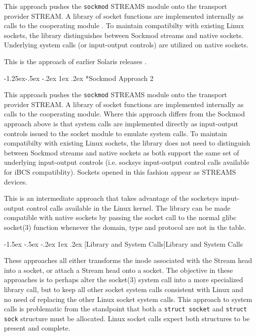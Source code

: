 \documentclass[letterpaper,final,notitlepage,twocolumn,10pt,twoside]{article}
\makeatletter
\renewcommand\subsection{\@startsection{subsection}{2}{\z@}%
                                     {-1.5ex \@plus -.5ex \@minus -.2ex}%
                                     {1ex \@plus .2ex}%
                                     {\normalfont\normalsize\bfseries}}
\renewcommand\subsubsection{\@startsection{subsubsection}{3}{\z@}%
                                     {-1.25ex\@plus -.5ex \@minus -.2ex}%
                                     {1ex \@plus .2ex}%
                                     {\normalfont\normalsize\bfseries}}
\makeatother
\begin{document}
This approach pushes the \texttt{sockmod} STREAMS module onto the transport
provider STREAM.  A library of socket functions are implemented internally as
calls to the cooperating module \cite[]{impbsd}.
To maintain compatibilty with existing Linux sockets, the library
distinguishes between Sockmod streams and native sockets.  Underlying system calls
(or input-output controls) are utilized on native sockets.

This is the approach of earlier Solaris releases \cite[]{impbsd}.

\subsubsection*{Sockmod Approach 2}

This approach pushes the \texttt{sockmod} STREAMS module onto the transport
provider STREAM.  A library of socket functions are implemented internally as
calls to the cooperating module.  Where this approach differs from the Sockmod
approach above is that system calls are implemented directly as input-output
controls issued to the socket module to emulate system calls.
To maintain compatibilty with existing Linux sockets, the library
does not need to distinguish between Sockmod streams and native sockets as
both support the same set of underlying input-output controls (i.e. socksys
input-output control calls available for iBCS compatiblity).  Sockets opened
in this fashion appear as STREAMS devices.

This is an intermediate approach that takes advantage of the socketsys
input-output control calls available in the Linux kernel.
The library can be made compatible with native sockets by passing the socket
call to the normal glibc socket(3) function whenever the domain, type and
protocol are not in the table.

\subsection[Library and System Calls]{Library and System Calls}

These approaches all either transforms the inode associated with the Stream
head into a socket, or attach a Stream head onto a socket.  The objective in
these approaches is to perhaps alter the socket(3) system call into a more
specialized library call, but to keep all other socket system calls consistent
with Linux and no need of replacing the other Linux socket system calls.  This
approach to system calls is problematic from the standpoint that both a
\texttt{struct socket} and \texttt{struct sock} structure must be allocated.
Linux socket calls expect both structures to be present and complete.
\end{document}

